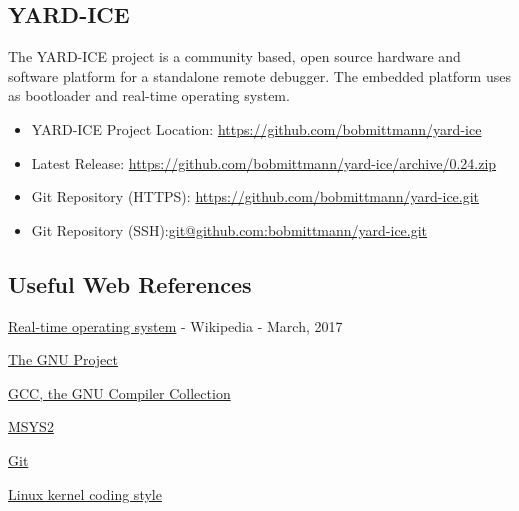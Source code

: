 \subsection{YARD-ICE}

The YARD-ICE project is a community based, open source hardware and software platform for a standalone remote debugger. The embedded platform uses \ThinkOS as bootloader and real-time operating system.

\begin{itemize}
\tightlist
\item
  {YARD-ICE Project Location:
  }{\href{https://github.com/bobmittmann/yard-ice}{https://github.com/bobmittmann/yard-ice}}
\item
  {Latest Release:
  }{\href{https://github.com/bobmittmann/yard-ice/archive/0.24.zip}{https://github.com/bobmittmann/yard-ice/archive/0.24.zip}}
\item
  {Git Repository (HTTPS):}
  {\href{https://github.com/bobmittmann/yard-ice.git}{https://github.com/bobmittmann/yard-ice.git}}
\item
  {Git Repository (SSH):}{\href{git@github.com:bobmittmann/yard-ice.git}{git@github.com:bobmittmann/yard-ice.git}}
\end{itemize}

\subsection{Useful Web References}

\begin{flushleft}
\href{https://en.wikipedia.org/wiki/Real-time_operating_system}{Real-time operating system} - Wikipedia - March, 2017
\end{flushleft}

\begin{flushleft}
\href{https://www.gnu.org/gnu/thegnuproject.en.html}{The GNU Project}\\
\end{flushleft}

\begin{flushleft}
\href{https://gcc.gnu.org/}{GCC, the GNU Compiler Collection}\\
\end{flushleft}

\begin{flushleft}
\href{https://github.com/msys2/msys2/wiki}{MSYS2}\\
\end{flushleft}

\begin{flushleft}
\href{https://git-scm.com/downloads}{Git}\\
\end{flushleft}

\begin{flushleft}
\href{https://www.kernel.org/doc/html/v4.10/process/coding-style.html}{Linux kernel coding style}\\
\end{flushleft}




